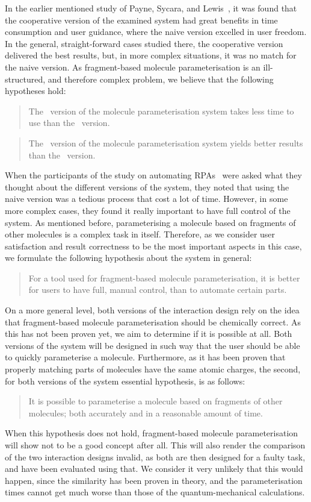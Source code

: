 In the earlier mentioned study of Payne, Sycara, and Lewis~\cite{payne2000varying}, it was found that the cooperative version of the examined system had great benefits in time consumption and user guidance, where the naive version excelled in user freedom. In the general, straight-forward cases studied there, the cooperative version delivered the best results, but, in more complex situations, it was no match for the naive version. As fragment-based molecule parameterisation is an ill-structured, and therefore complex problem, we believe that the following hypotheses hold:
\begin{quote}
The \IDb\ version of the molecule parameterisation system takes less time to use than the \IDa\ version.
\end{quote}
\begin{quote}
The \IDa\ version of the molecule parameterisation system yields better results than the \IDb\ version.
\end{quote}

When the participants of the study on automating RPAs~\cite{payne2000varying} were asked what they thought about the different versions of the system, they noted that using the naive version was a tedious process that cost a lot of time. However, in some more complex cases, they found it really important to have full control of the system. As mentioned before, parameterising a molecule based on fragments of other molecules is a complex task in itself. Therefore, as we consider user satisfaction and result correctness to be the most important aspects in this case, we formulate the following hypothesis about the system in general:
\begin{quote}
For a tool used for fragment-based molecule parameterisation, it is better for users to have full, manual control, than to automate certain parts.
\end{quote}

On a more general level, both versions of the interaction design rely on the idea that fragment-based molecule parameterisation should be chemically correct. As this has not been proven yet, we aim to determine if it is possible at all. Both versions of the system will be designed in such way that the user should be able to quickly parameterise a molecule. Furthermore, as it has been proven that properly matching parts of molecules have the same atomic charges, the second, for both versions of the system essential hypothesis, is as follows:
\begin{quote}
It is possible to parameterise a molecule based on fragments of other molecules; both accurately and in a reasonable amount of time.
\end{quote}

When this hypothesis does not hold, fragment-based molecule parameterisation will show not to be a good concept after all. This will also render the comparison of the two interaction designs invalid, as both are then designed for a faulty task, and have been evaluated using that. We consider it very unlikely that this would happen, since the similarity has been proven in theory, and the parameterisation times cannot get much worse than those of the quantum-mechanical calculations.
